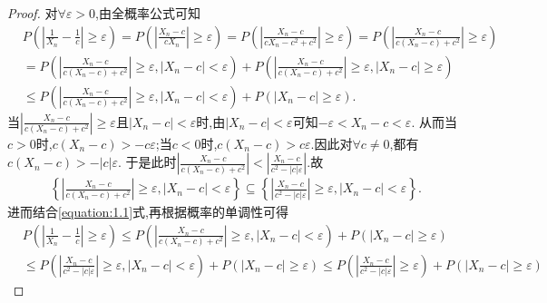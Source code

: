 \documentclass[lang=cn,newtx,10pt,sCheme=Chinese,citestyle=gb7714-2015, bibstyle=gb7714-2015]{../../Template/elegantbook}
\begin{document}
\begin{proof}

对\(\forall \varepsilon > 0\),由全概率公式可知
\begin{equation}\label{equation:1.1}
\begin{aligned}
&P\left(\left|\frac{1}{X_n} - \frac{1}{c}\right| \geqslant \varepsilon\right) = P\left(\left|\frac{X_n - c}{cX_n}\right| \geqslant \varepsilon\right) = P\left(\left|\frac{X_n - c}{cX_n - c^2 + c^2}\right| \geqslant \varepsilon\right) = P\left(\left|\frac{X_n - c}{c(X_n - c) + c^2}\right| \geqslant \varepsilon\right)
\\
&= P\left(\left|\frac{X_n - c}{c(X_n - c) + c^2}\right| \geqslant \varepsilon,\left|X_n - c\right| < \varepsilon\right) + P\left(\left|\frac{X_n - c}{c(X_n - c) + c^2}\right| \geqslant \varepsilon,\left|X_n - c\right| \geqslant \varepsilon\right)
\\
&\leqslant P\left(\left|\frac{X_n - c}{c(X_n - c) + c^2}\right| \geqslant \varepsilon,\left|X_n - c\right| < \varepsilon\right) + P\left(\left|X_n - c\right| \geqslant \varepsilon\right).
\end{aligned}
\end{equation}
当\(\left|\frac{X_n - c}{c(X_n - c) + c^2}\right| \geqslant \varepsilon\)且\(\left|X_n - c\right| < \varepsilon\)时,由\(\left|X_n - c\right| < \varepsilon\)可知\(-\varepsilon < X_n - c < \varepsilon\).
从而当\(c > 0\)时,\(c(X_n - c) > -c\varepsilon\);当\(c < 0\)时,\(c(X_n - c) > c\varepsilon\).因此对\(\forall c \neq 0\),都有\(c(X_n - c) > -|c|\varepsilon\).
于是此时\(\left|\frac{X_n - c}{c(X_n - c) + c^2}\right| < \left|\frac{X_n - c}{c^2 - |c|\varepsilon}\right|\).故
\begin{align*}
\left\{\left|\frac{X_n - c}{c(X_n - c) + c^2}\right| \geqslant \varepsilon,\left|X_n - c\right| < \varepsilon\right\} \subseteq \left\{\left|\frac{X_n - c}{c^2 - |c|\varepsilon}\right| \geqslant \varepsilon,\left|X_n - c\right| < \varepsilon\right\}.
\end{align*}
进而结合\eqref{equation:1.1}式,再根据概率的单调性可得
\begin{align*}
&P\left(\left|\frac{1}{X_n} - \frac{1}{c}\right| \geqslant \varepsilon\right) \leqslant P\left(\left|\frac{X_n - c}{c(X_n - c) + c^2}\right| \geqslant \varepsilon,\left|X_n - c\right| < \varepsilon\right) + P\left(\left|X_n - c\right| \geqslant \varepsilon\right)
\\
&\leqslant P\left(\left|\frac{X_n - c}{c^2 - |c|\varepsilon}\right| \geqslant \varepsilon,\left|X_n - c\right| < \varepsilon\right) + P\left(\left|X_n - c\right| \geqslant \varepsilon\right) \leqslant P\left(\left|\frac{X_n - c}{c^2 - |c|\varepsilon}\right| \geqslant \varepsilon\right) + P\left(\left|X_n - c\right| \geqslant \varepsilon\right)

\end{align*}
\end{proof}
\end{document}
